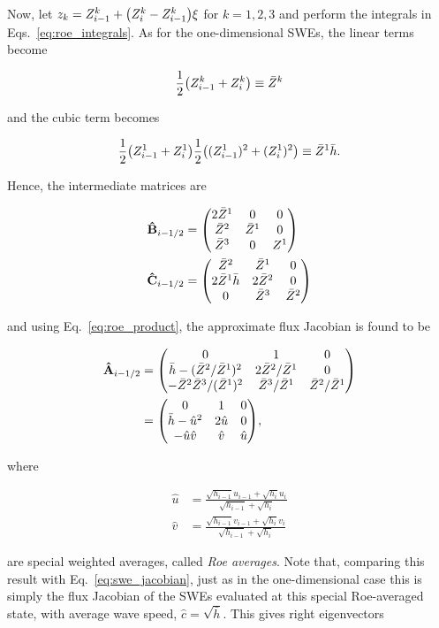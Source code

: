 Now, let $z_k = Z^k_{i-1} + \qty(Z^k_i - Z^k_{i-1})\xi$ for $k = 1, 2, 3$ and perform the integrals in Eqs.~\ref{eq:roe_integrals}. As for the one-dimensional SWEs, the linear terms become

\begin{align}
  \frac{1}{2}\qty(Z^k_{i-1} + Z^k_i) \equiv \bar Z^k
\end{align}

and the cubic term becomes

\begin{align}
  \frac{1}{2}\qty(Z^1_{i-1} + Z^1_i) \frac{1}{2} \qty((Z^1_{i-1})^2 + (Z^1_i)^2) \equiv \bar Z^1 \bar h.
\end{align}

Hence, the intermediate matrices are

\begin{align}
  \vu B_{i-1/2} &= \mqty(
    2\bar Z^1 & 0 & 0 \\
    \bar Z^2 & \bar Z^1 & 0 \\
    \bar Z^3 & 0 & Z^1
  ) \\
  \vu C_{i-1/2} &= \mqty(
    \bar Z^2 & \bar Z^1 & 0 \\
    2 \bar Z^1 \bar h & 2\bar Z^2 & 0 \\
    0 & \bar Z^3 & \bar Z^2
  )
\end{align}

and using Eq.~\ref{eq:roe_product}, the approximate flux Jacobian is found to be

\begin{align}
  \vu A_{i-1/2} &= \mqty(
    0 & 1 & 0 \\
    \bar h - (\bar Z^2 / \bar Z^1)^2 & 2 \bar Z^2 / \bar Z^1 & 0 \\
    - \bar Z^2 \bar Z^3 / (\bar Z^1)^2 & \bar Z^3 / \bar Z^1 & \bar Z^2 / \bar Z^1
  ) \\
  &= \mqty(
    0 & 1 & 0 \\
    \bar h - \hat u^2 & 2 \hat u & 0 \\
    -\hat u\hat v & \hat v & \hat u
  ),
\end{align}

where

\begin{align}
  \hat u &= \frac{\sqrt{h_{i-1}}u_{i-1}+\sqrt{h_i}u_i}{\sqrt{h_{i-1}}+\sqrt{h_i}} \\
  \hat v &= \frac{\sqrt{h_{i-1}}v_{i-1}+\sqrt{h_i}v_i}{\sqrt{h_{i-1}}+\sqrt{h_i}}
\end{align}

are special weighted averages, called \emph{Roe averages}. Note that, comparing this result with Eq.~\ref{eq:swe_jacobian}, just as in the one-dimensional case this is simply the flux Jacobian of the SWEs evaluated at this special Roe-averaged state, with average wave speed, $\hat c = \sqrt{\bar h}$. This gives right eigenvectors

